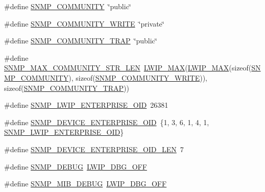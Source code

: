 \begin{DoxyCompactItemize}
\item 
\#define \hyperlink{group__snmp__opts_ga316c1e1f06f0c7ca56589563809e64db}{S\+N\+M\+P\+\_\+\+C\+O\+M\+M\+U\+N\+I\+TY}~\char`\"{}public\char`\"{}
\item 
\#define \hyperlink{group__snmp__opts_gafb9414dc7a33978b62a3a9838b659464}{S\+N\+M\+P\+\_\+\+C\+O\+M\+M\+U\+N\+I\+T\+Y\+\_\+\+W\+R\+I\+TE}~\char`\"{}private\char`\"{}
\item 
\#define \hyperlink{group__snmp__opts_gaaefc9dda5f8e5c296018a463cdbac39b}{S\+N\+M\+P\+\_\+\+C\+O\+M\+M\+U\+N\+I\+T\+Y\+\_\+\+T\+R\+AP}~\char`\"{}public\char`\"{}
\item 
\#define \hyperlink{group__snmp__opts_ga0e98b58159a77688f87f9f50479177fd}{S\+N\+M\+P\+\_\+\+M\+A\+X\+\_\+\+C\+O\+M\+M\+U\+N\+I\+T\+Y\+\_\+\+S\+T\+R\+\_\+\+L\+EN}~\hyperlink{openmote-cc2538_2lwip_2src_2include_2lwip_2def_8h_a21ea174d374106caeafb4aa3a24fbd2b}{L\+W\+I\+P\+\_\+\+M\+AX}(\hyperlink{openmote-cc2538_2lwip_2src_2include_2lwip_2def_8h_a21ea174d374106caeafb4aa3a24fbd2b}{L\+W\+I\+P\+\_\+\+M\+AX}(sizeof(\hyperlink{group__snmp__opts_ga316c1e1f06f0c7ca56589563809e64db}{S\+N\+M\+P\+\_\+\+C\+O\+M\+M\+U\+N\+I\+TY}), sizeof(\hyperlink{group__snmp__opts_gafb9414dc7a33978b62a3a9838b659464}{S\+N\+M\+P\+\_\+\+C\+O\+M\+M\+U\+N\+I\+T\+Y\+\_\+\+W\+R\+I\+TE})), sizeof(\hyperlink{group__snmp__opts_gaaefc9dda5f8e5c296018a463cdbac39b}{S\+N\+M\+P\+\_\+\+C\+O\+M\+M\+U\+N\+I\+T\+Y\+\_\+\+T\+R\+AP}))
\item 
\#define \hyperlink{group__snmp__opts_ga868bfef6efe05515c86291137a633479}{S\+N\+M\+P\+\_\+\+L\+W\+I\+P\+\_\+\+E\+N\+T\+E\+R\+P\+R\+I\+S\+E\+\_\+\+O\+ID}~26381
\item 
\#define \hyperlink{group__snmp__opts_ga09118b734e85df152af098744e888b34}{S\+N\+M\+P\+\_\+\+D\+E\+V\+I\+C\+E\+\_\+\+E\+N\+T\+E\+R\+P\+R\+I\+S\+E\+\_\+\+O\+ID}~\{1, 3, 6, 1, 4, 1, \hyperlink{group__snmp__opts_ga868bfef6efe05515c86291137a633479}{S\+N\+M\+P\+\_\+\+L\+W\+I\+P\+\_\+\+E\+N\+T\+E\+R\+P\+R\+I\+S\+E\+\_\+\+O\+ID}\}
\item 
\#define \hyperlink{group__snmp__opts_ga9e39ba5308f5c7ac5296c7d05fdfa97f}{S\+N\+M\+P\+\_\+\+D\+E\+V\+I\+C\+E\+\_\+\+E\+N\+T\+E\+R\+P\+R\+I\+S\+E\+\_\+\+O\+I\+D\+\_\+\+L\+EN}~7
\item 
\#define \hyperlink{group__snmp__opts_gac041000361342f51ad5ee5d8f6254e02}{S\+N\+M\+P\+\_\+\+D\+E\+B\+UG}~\hyperlink{group__debugging__levels_gadab1cdc3f45939a3a5c9a3d7e04987e1}{L\+W\+I\+P\+\_\+\+D\+B\+G\+\_\+\+O\+FF}
\item 
\#define \hyperlink{group__snmp__opts_gac12240265db443eaf9d31d187e586c16}{S\+N\+M\+P\+\_\+\+M\+I\+B\+\_\+\+D\+E\+B\+UG}~\hyperlink{group__debugging__levels_gadab1cdc3f45939a3a5c9a3d7e04987e1}{L\+W\+I\+P\+\_\+\+D\+B\+G\+\_\+\+O\+FF}

\end{DoxyCompactItemize}
